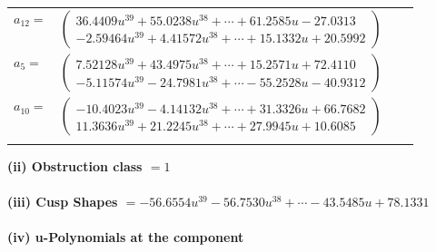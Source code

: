 \documentclass[1p]{elsarticle_modified}
\theoremstyle{definition}
\begin{document}
\begin{tabular}{m{7pt} m{180pt} m{7pt} m{180pt} }
\flushright $a_{12}=$&$\begin{pmatrix}36.4409 u^{39}+55.0238 u^{38}+\cdots+61.2585 u-27.0313\\-2.59464 u^{39}+4.41572 u^{38}+\cdots+15.1332 u+20.5992\end{pmatrix}$ \\
\flushright $a_{5}=$&$\begin{pmatrix}7.52128 u^{39}+43.4975 u^{38}+\cdots+15.2571 u+72.4110\\-5.11574 u^{39}-24.7981 u^{38}+\cdots-55.2528 u-40.9312\end{pmatrix}$ \\
\flushright $a_{10}=$&$\begin{pmatrix}-10.4023 u^{39}-4.14132 u^{38}+\cdots+31.3326 u+66.7682\\11.3636 u^{39}+21.2245 u^{38}+\cdots+27.9945 u+10.6085\end{pmatrix}$\\&\end{tabular}
\flushleft \textbf{(ii) Obstruction class $= 1$}\\~\\
\flushleft \textbf{(iii) Cusp Shapes $= -56.6554 u^{39}-56.7530 u^{38}+\cdots-43.5485 u+78.1331$}\\~\\
\newpage\renewcommand{\arraystretch}{1}
\flushleft \textbf{(iv) u-Polynomials at the component}\newline \\
\end{document}
